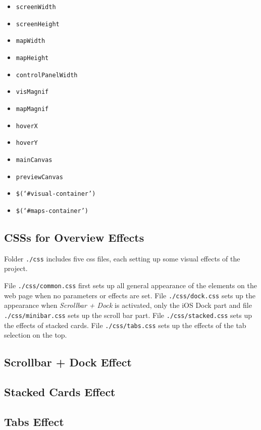 \begin{itemize}
  \item \texttt{screenWidth}
  \item \texttt{screenHeight}
  \item \texttt{mapWidth}
  \item \texttt{mapHeight}
  \item \texttt{controlPanelWidth}
  \item \texttt{visMagnif}
  \item \texttt{mapMagnif}
  \item \texttt{hoverX}
  \item \texttt{hoverY}
  \item \texttt{mainCanvas}
  \item \texttt{previewCanvas}
  \item \texttt{\$(`\#visual-container')}
  \item \texttt{\$(`\#maps-container')}
\end{itemize}

\subsection{CSSs for Overview Effects}
\label{chap4:frontend-css}

Folder \texttt{./css} includes five \gls{css} files, each setting up some visual effects of the project.

File \texttt{./css/common.css} first sets up all general appearance of the elements on the web page when no parameters or effects are set. File \texttt{./css/dock.css} sets up the appearance when \emph{Scrollbar + Dock} is activated, only the iOS Dock part and file \\\texttt{./css/minibar.css} sets up the scroll bar part. File \texttt{./css/stacked.css} sets up the effects of stacked cards. File \texttt{./css/tabs.css} sets up the effects of the tab selection on the top.

\subsection{Scrollbar + Dock Effect}

\subsection{Stacked Cards Effect}

\subsection{Tabs Effect}

